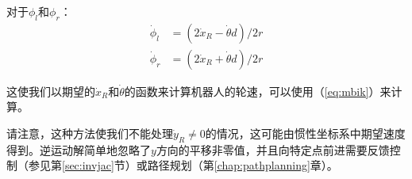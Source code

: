对于$\phi_l$和$\phi_r$：
\begin{eqnarray}
\dot{\phi}_l &= (2\dot{x}_R - \dot{\theta}d)/2r\\
\nonumber
\dot{\phi}_r &= (2\dot{x}_R + \dot{\theta}d)/2r
\end{eqnarray}



这使我们以期望的$\dot{x}_R$和$\dot{\theta}$的函数来计算机器人的轮速，可以使用（\ref{eq:mbik}）来计算。

请注意，这种方法使我们不能处理$\dot{y}_R\neq 0$的情况，这可能由惯性坐标系中期望速度得到。逆运动解简单地忽略了$y$方向的平移非零值，并且向特定点前进需要反馈控制（参见第\ref{sec:invjac}节）或路径规划（第\ref{chap:pathplanning}章）。



